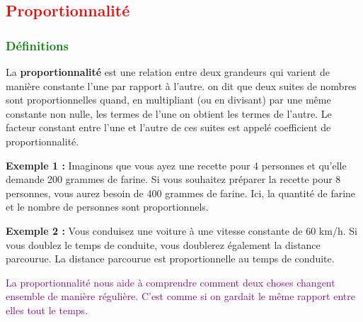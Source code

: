 \documentclass{article}
\begin{document}
\subsection{\textcolor{red}{Proportionnalité}}

\subsubsection{\textcolor{green}{Définitions}}

\begin{tcolorbox}[colback=red!10!white, colframe=red!75!black, title=\textcolor{white}{Définition}, 
                  sharp corners=southwest]
    La \textbf{proportionnalité} est une relation entre deux grandeurs qui varient de manière constante l'une par rapport à l'autre. on dit que deux suites de nombres sont proportionnelles quand, en multipliant (ou en divisant) par une même constante non nulle, les termes de l'une on obtient les termes de l'autre. Le facteur constant entre l'une et l'autre de ces suites est appelé coefficient de proportionnalité.
\end{tcolorbox}

\vspace{0.2cm}

\begin{tcolorbox}[colback=orange!10!white, colframe=orange!75!black, title=\textcolor{white}{Exemples}, 
                  sharp corners=south]
    \textbf{Exemple 1 :} Imaginons que vous ayez une recette pour 4 personnes et qu'elle demande 200 grammes de farine. Si vous souhaitez préparer la recette pour 8 personnes, vous aurez besoin de 400 grammes de farine. Ici, la quantité de farine et le nombre de personnes sont proportionnels.

    \vspace{0.2cm}

    \textbf{Exemple 2 :} Vous conduisez une voiture à une vitesse constante de 60 km/h. Si vous doublez le temps de conduite, vous doublerez également la distance parcourue. La distance parcourue est proportionnelle au temps de conduite.
\end{tcolorbox}

\vspace{0.2cm}

\begin{tcolorbox}[colback=purple!10!white, colframe=purple!75!black, title=\textcolor{white}{Note}, 
                  sharp corners=south]
    \textcolor{purple}{La proportionnalité nous aide à comprendre comment deux choses changent ensemble de manière régulière. C'est comme si on gardait le même rapport entre elles tout le temps.}
\end{tcolorbox}
\end{document}
